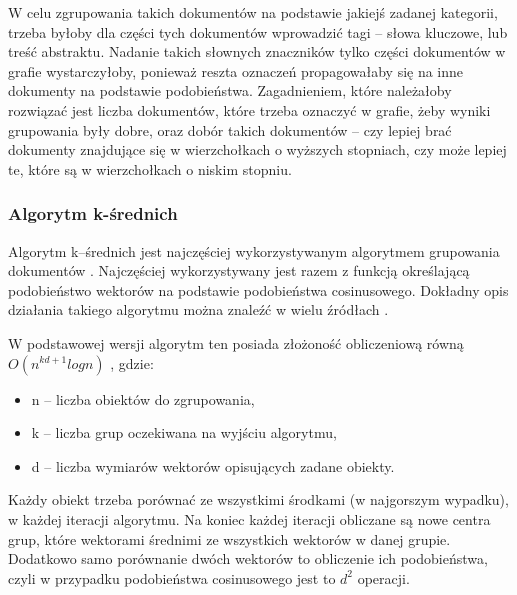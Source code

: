 \documentclass{article}
\begin{document}
W celu zgrupowania takich dokumentów na podstawie jakiejś zadanej kategorii, trzeba byłoby dla części tych dokumentów wprowadzić tagi – słowa kluczowe, lub treść abstraktu. Nadanie takich słownych znaczników tylko części dokumentów w grafie wystarczyłoby, ponieważ reszta oznaczeń propagowałaby się na inne dokumenty na podstawie podobieństwa. Zagadnieniem, które należałoby rozwiązać jest liczba dokumentów, które trzeba oznaczyć w grafie, żeby wyniki grupowania były dobre, oraz dobór takich dokumentów – czy lepiej brać dokumenty znajdujące się w wierzchołkach o wyższych stopniach, czy może lepiej te, które są w wierzchołkach o niskim stopniu.

\subsubsection{Algorytm k-średnich}

Algorytm k--średnich jest najczęściej wykorzystywanym algorytmem grupowania dokumentów . Najczęściej wykorzystywany jest razem z funkcją określającą podobieństwo wektorów na podstawie podobieństwa cosinusowego. Dokładny opis działania takiego algorytmu można znaleźć w wielu źródłach . 

W podstawowej wersji algorytm ten posiada złożoność obliczeniową równą $O(n^{kd+1}log n)$ , gdzie:
\begin{itemize}
	\item n – liczba obiektów do zgrupowania,
	\item k – liczba grup oczekiwana na wyjściu algorytmu,
	\item d – liczba wymiarów wektorów opisujących zadane obiekty.
\end{itemize}
Każdy obiekt trzeba porównać ze wszystkimi środkami (w najgorszym wypadku), w każdej iteracji algorytmu. Na koniec każdej iteracji obliczane są nowe centra grup, które wektorami średnimi ze wszystkich wektorów w danej grupie. Dodatkowo samo porównanie dwóch wektorów to obliczenie ich podobieństwa, czyli w przypadku podobieństwa cosinusowego jest to $d^2$ operacji.

\end{document}
